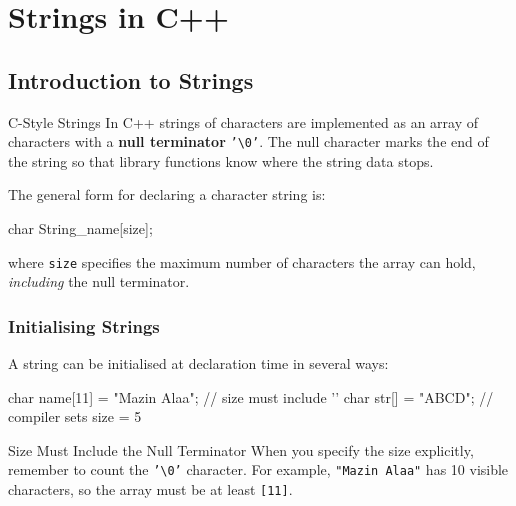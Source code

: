 \chapter{Strings in C++}
\label{ch:strings}

\section{Introduction to Strings}
\label{sec:strings-intro}

\begin{definitionbox}{C-Style Strings}
In C++ strings of characters are implemented as an array of characters
with a \textbf{null terminator} \texttt{'\textbackslash 0'}.  The null
character marks the end of the string so that library functions know where
the string data stops.
\end{definitionbox}

\noindent
The general form for declaring a character string is:

\begin{cppcode}
char String_name[size];
\end{cppcode}

\noindent
where \texttt{size} specifies the maximum number of characters the array
can hold, \emph{including} the null terminator.

\subsection{Initialising Strings}

A string can be initialised at declaration time in several ways:

\begin{cppcode}
char name[11] = "Mazin Alaa";   // size must include '\0'
char str[]    = "ABCD";         // compiler sets size = 5
\end{cppcode}

\begin{warningbox}{Size Must Include the Null Terminator}
When you specify the size explicitly, remember to count the
\texttt{'\textbackslash 0'} character.  For example,
\texttt{"Mazin Alaa"} has 10 visible characters, so the array must be
at least \texttt{[11]}.
\end{warningbox}

